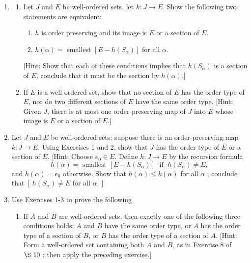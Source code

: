 \begin{enumerate}[itemsep=0.4em, parsep=0pt, topsep=0pt, partopsep=0pt, leftmargin=*, label=\arabic*., ref=\arabic*]
  [Hint: Follow the pattern outlined in Exercise 10 of \(\S\ {10}\).]
\item
  \begin{enumerate}[itemsep=0.2em, parsep=0pt, topsep=0pt, partopsep=0pt, leftmargin=*, label=(\alph*), align=left]
  \item Let \(J\) and \(E\) be well-ordered sets, let \(h : J \rightarrow E\). Show the following two statements are equivalent:
    \begin{enumerate}[itemsep=0.2em, parsep=0pt, topsep=0pt, partopsep=0pt, leftmargin=*, label=(\roman*), align=left]
    \item \(h\) is order preserving and its image is \(E\) or a section of \(E\).
    \item \(h(\alpha) =\) smallest \([{E - h(S_{\alpha }) }]\) for all \(\alpha\).
    \end{enumerate}
  [Hint: Show that each of these conditions implies that \(h(S_{\alpha })\) is a section of \(E\), conclude that it must be the section by \(h(\alpha)\).]
  \item If \(E\) is a well-ordered set, show that no section of \(E\) has the order type of \(E\), nor do two different sections of \(E\) have the same order type. [Hint: Given \(J\), there is at most one order-preserving map of \(J\) into \(E\) whose image is \(E\) or a section of \(E\).]
  \end{enumerate}
\item Let \(J\) and \(E\) be well-ordered sets; suppose there is an order-preserving map \(k : J \rightarrow E\). Using Exercises 1 and 2, show that \(J\) has the order type of \(E\) or a section of \(E\). [Hint: Choose \(e_{0} \in E\). Define \(h : J \rightarrow E\) by the recursion formula
 \[ h(\alpha) = \text{ smallest }[{E - h(S_{\alpha }) }] \;\text{ if }\;h(S_{\alpha }) \neq E, \]
 and \(h(\alpha) = e_{0}\) otherwise. Show that \(h(\alpha) \leq k(\alpha)\) for all \(\alpha\) ; conclude that \([\,h(S_{\alpha }) \neq E\text{ for all }\alpha .\,]\)
\item Use Exercises 1-3 to prove the following
  \begin{enumerate}[itemsep=0.2em, parsep=0pt, topsep=0pt, partopsep=0pt, leftmargin=*, label=(\alph*), align=left]
  \item If \(A\) and \(B\) are well-ordered sets, then exactly one of the following three conditions holds: \(A\) and \(B\) have the same order type, or \(A\) has the order type of a section of \(B\), or \(B\) has the order type of a section of \(A\). [Hint: Form a well-ordered set containing both \(A\) and \(B\), as in Exercise 8 of \(\S\ {10}\) ; then apply the preceding exercise.]

\end{enumerate}
\end{enumerate}
